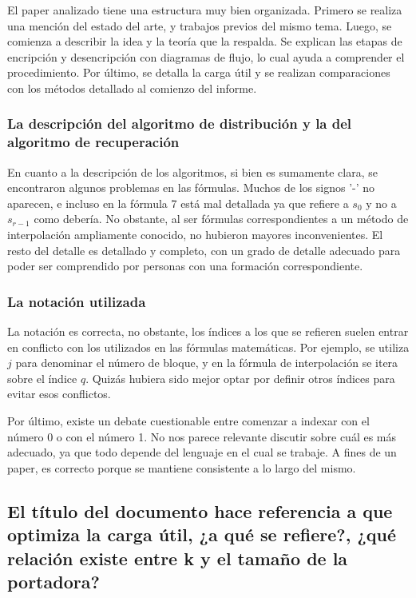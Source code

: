 \documentclass[11pt]{scrartcl} %
\begin{document}
El paper analizado tiene una estructura muy bien organizada. Primero se realiza una mención del estado del arte, y trabajos previos del mismo tema. Luego, se comienza a describir la idea y la teoría que la respalda. Se explican las etapas de encripción y desencripción con diagramas de flujo, lo cual ayuda a comprender el procedimiento. Por último, se detalla la carga útil y se realizan comparaciones con los métodos detallado al comienzo del informe.

\subsubsection{La descripción del algoritmo de distribución y la del algoritmo de recuperación}

En cuanto a la descripción de los algoritmos, si bien es sumamente clara, se encontraron algunos problemas en las fórmulas. Muchos de los signos '-' no aparecen, e incluso en la fórmula 7 está mal detallada ya que refiere a $s_{0}$ y no a $s_{r-1}$ como debería. No obstante, al ser fórmulas correspondientes a un método de interpolación ampliamente conocido, no hubieron mayores inconvenientes. El resto del detalle es detallado y completo, con un grado de detalle adecuado para poder ser comprendido por personas con una formación correspondiente.

\subsubsection{La notación utilizada}

La notación es correcta, no obstante, los índices a los que se refieren suelen entrar en conflicto con los utilizados en las fórmulas matemáticas. Por ejemplo, se utiliza $j$ para denominar el número de bloque, y en la fórmula de interpolación se itera sobre el índice $q$. Quizás hubiera sido mejor optar por definir otros índices para evitar esos conflictos.

Por último, existe un debate cuestionable entre comenzar a indexar con el número 0 o con el número 1. No nos parece relevante discutir sobre cuál es más adecuado, ya que todo depende del lenguaje en el cual se trabaje. A fines de un paper, es correcto porque se mantiene consistente a lo largo del mismo.


\subsection{El título del documento hace referencia a que optimiza la carga útil, ¿a qué se refiere?, ¿qué relación existe entre k y el tamaño de la portadora?}
\end{document}
